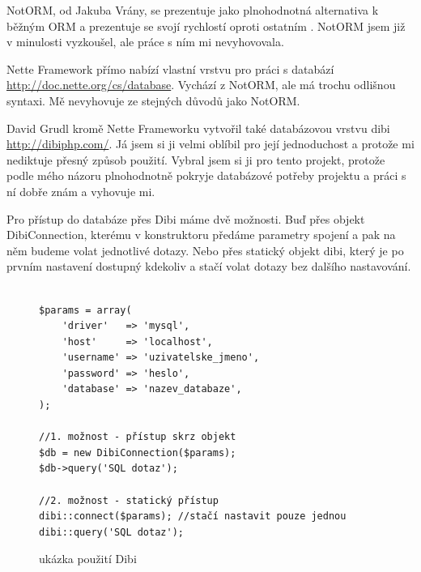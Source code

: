 \documentclass[thesis=B,czech]{FITthesis}[2011/06/14]
\begin{document}
NotORM, od Jakuba Vrány, se prezentuje jako plnohodnotná alternativa k běžným ORM a prezentuje se svojí rychlostí oproti ostatním \cite{notorm}. NotORM jsem již v minulosti vyzkoušel, ale práce s ním mi nevyhovovala. 

Nette Framework přímo nabízí vlastní vrstvu pro práci s databází \url{http://doc.nette.org/cs/database}. Vychází z NotORM, ale má trochu odlišnou syntaxi. Mě nevyhovuje ze stejných důvodů jako NotORM.

David Grudl kromě Nette Frameworku vytvořil také databázovou vrstvu dibi \url{http://dibiphp.com/}. Já jsem si ji velmi oblíbil pro její jednoduchost a protože mi nediktuje přesný způsob použití. Vybral jsem si ji pro tento projekt, protože podle mého názoru plnohodnotně pokryje databázové potřeby projektu a práci s ní dobře znám a vyhovuje mi.

Pro přístup do databáze přes Dibi máme dvě možnosti. Buď přes objekt DibiConnection, kterému v konstruktoru předáme parametry spojení a pak na něm budeme volat jednotlivé dotazy. Nebo přes statický objekt dibi, který je po prvním nastavení dostupný kdekoliv a stačí volat dotazy bez dalšího nastavování.

\begin{figure}[h]\centering
\begin{verbatim}

$params = array(
    'driver'   => 'mysql',
    'host'     => 'localhost',
    'username' => 'uzivatelske_jmeno',
    'password' => 'heslo',
    'database' => 'nazev_databaze',
);

//1. možnost - přístup skrz objekt
$db = new DibiConnection($params);
$db->query('SQL dotaz');

//2. možnost - statický přístup
dibi::connect($params); //stačí nastavit pouze jednou
dibi::query('SQL dotaz');

\end{verbatim}
\caption{ukázka použití Dibi}
\end{figure}
\end{document}
